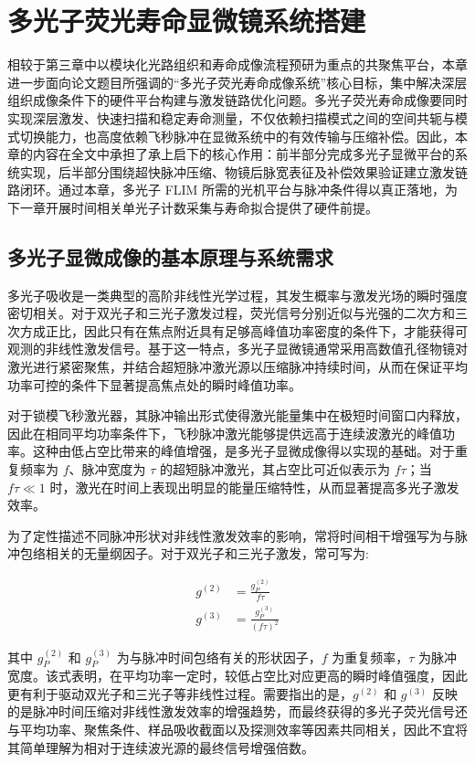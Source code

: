 \chapter{多光子荧光寿命显微镜系统搭建}\label{Chap:4}

相较于第三章中以模块化光路组织和寿命成像流程预研为重点的共聚焦平台，本章进一步面向论文题目所强调的“多光子荧光寿命成像系统”核心目标，集中解决深层组织成像条件下的硬件平台构建与激发链路优化问题。多光子荧光寿命成像要同时实现深层激发、快速扫描和稳定寿命测量，不仅依赖扫描模式之间的空间共轭与模式切换能力，也高度依赖飞秒脉冲在显微系统中的有效传输与压缩补偿。因此，本章的内容在全文中承担了承上启下的核心作用：前半部分完成多光子显微平台的系统实现，后半部分围绕超快脉冲压缩、物镜后脉宽表征及补偿效果验证建立激发链路闭环。通过本章，多光子 FLIM 所需的光机平台与脉冲条件得以真正落地，为下一章开展时间相关单光子计数采集与寿命拟合提供了硬件前提。

\section{多光子显微成像的基本原理与系统需求}\label{4.1}

多光子吸收是一类典型的高阶非线性光学过程，其发生概率与激发光场的瞬时强度密切相关。对于双光子和三光子激发过程，荧光信号分别近似与光强的二次方和三次方成正比，因此只有在焦点附近具有足够高峰值功率密度的条件下，才能获得可观测的非线性激发信号。基于这一特点，多光子显微镜通常采用高数值孔径物镜对激光进行紧密聚焦，并结合超短脉冲激光源以压缩脉冲持续时间，从而在保证平均功率可控的条件下显著提高焦点处的瞬时峰值功率。

对于锁模飞秒激光器，其脉冲输出形式使得激光能量集中在极短时间窗口内释放，因此在相同平均功率条件下，飞秒脉冲激光能够提供远高于连续波激光的峰值功率。这种由低占空比带来的峰值增强，是多光子显微成像得以实现的基础。对于重复频率为 $f$、脉冲宽度为 $\tau$ 的超短脉冲激光，其占空比可近似表示为 $f\tau$；当 $f\tau \ll 1$ 时，激光在时间上表现出明显的能量压缩特性，从而显著提高多光子激发效率。

为了定性描述不同脉冲形状对非线性激发效率的影响，常将时间相干增强写为与脉冲包络相关的无量纲因子。对于双光子和三光子激发，常可写为:

\begin{align}
  g^{(2)} &= \frac{g_P^{(2)}}{f\tau}\\
  g^{(3)} &= \frac{g_P^{(3)}}{(f\tau)^2}
\end{align}

其中 $g_P^{(2)}$ 和 $g_P^{(3)}$ 为与脉冲时间包络有关的形状因子，$f$ 为重复频率，$\tau$ 为脉冲宽度。该式表明，在平均功率一定时，较低占空比对应更高的瞬时峰值强度，因此更有利于驱动双光子和三光子等非线性过程。需要指出的是，$g^{(2)}$ 和 $g^{(3)}$ 反映的是脉冲时间压缩对非线性激发效率的增强趋势，而最终获得的多光子荧光信号还与平均功率、聚焦条件、样品吸收截面以及探测效率等因素共同相关，因此不宜将其简单理解为相对于连续波光源的最终信号增强倍数。

